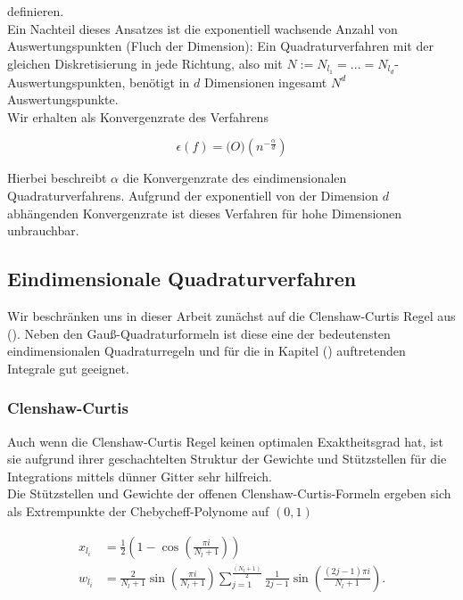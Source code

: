 \documentclass[12pt,a4paper]{scrartcl}
\numberwithin{equation}{section}
\begin{document}
{ definieren. \\
 
 Ein Nachteil dieses Ansatzes ist die exponentiell wachsende Anzahl von Auswertungspunkten (Fluch der Dimension):
 Ein Quadraturverfahren mit der gleichen Diskretisierung in jede Richtung, also mit $N:= N_{l_1} = ... = N_{l_d}$-Auswertungspunkten,
 benötigt in $d$ Dimensionen ingesamt $N^d$ Auswertungspunkte. \\
 
 Wir erhalten als Konvergenzrate des Verfahrens
 
 \begin{equation}
  \epsilon(f) = \mathcal(O)(n^{-\frac{\alpha}{d}})
 \end{equation}
 
 Hierbei beschreibt $\alpha$ die Konvergenzrate des eindimensionalen Quadraturverfahrens.
 Aufgrund der exponentiell von der Dimension $d$ abhängenden Konvergenzrate ist dieses Verfahren
 für hohe Dimensionen unbrauchbar.
 
 \subsection{Eindimensionale Quadraturverfahren}
 
 Wir beschränken uns in dieser Arbeit zunächst auf die Clenshaw-Curtis Regel aus ().
 Neben den Gauß-Quadraturformeln ist diese eine der bedeutensten eindimensionalen Quadraturregeln und
 für die in Kapitel () auftretenden Integrale gut geeignet. 
 
 \subsubsection{Clenshaw-Curtis}
 
 Auch wenn die Clenshaw-Curtis Regel keinen optimalen Exaktheitsgrad hat, ist sie aufgrund ihrer
 geschachtelten Struktur der Gewichte und Stützstellen für die Integrations mittels dünner Gitter 
 sehr hilfreich. \\
 Die Stützstellen und Gewichte der offenen Clenshaw-Curtis-Formeln ergeben sich als Extrempunkte der 
 Chebycheff-Polynome auf $(0,1)$
 
 \begin{equation}
  \begin{split}
      x_{l_i} &= \frac{1}{2}(1- \cos(\frac{\pi i}{N_l +1})) \\
      w_{l_i} &= \frac{2}{N_l +1} \sin{(\frac{\pi i}{N_l +1})} \sum_{j = 1}^{\frac{(N_l + 1)}{2}} \frac{1}{2j -1} \sin{(\frac{(2j -1) \pi i}{N_l +1})}.
    \end{split}
 \end{equation}

}
\end{document}
